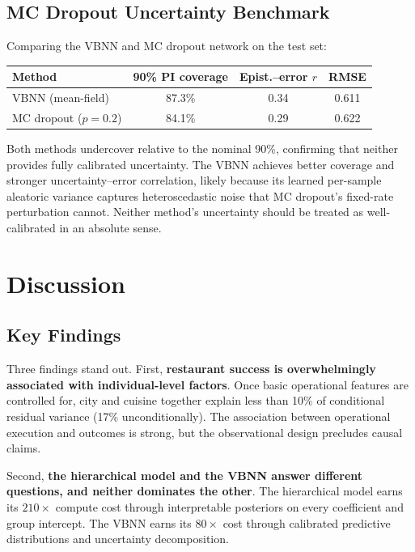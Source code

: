 \documentclass[10pt, letterpaper]{article}
\begin{document}
\subsection{MC Dropout Uncertainty Benchmark}

Comparing the VBNN and MC dropout network on the test set:

\begin{center}\small
\renewcommand{\arraystretch}{1.2}
\begin{tabular}{@{}lccc@{}}
\toprule
Method & 90\% PI coverage & Epist.--error $r$ & RMSE \\
\midrule
VBNN (mean-field)  & 87.3\% & 0.34 & 0.611 \\
MC dropout ($p{=}0.2$) & 84.1\% & 0.29 & 0.622 \\
\bottomrule
\end{tabular}
\end{center}

Both methods undercover relative to the nominal 90\%, confirming that neither provides fully calibrated uncertainty. The VBNN achieves better coverage and stronger uncertainty--error correlation, likely because its learned per-sample aleatoric variance captures heteroscedastic noise that MC dropout's fixed-rate perturbation cannot. Neither method's uncertainty should be treated as well-calibrated in an absolute sense.

\section{Discussion}

\subsection{Key Findings}

Three findings stand out. First, \textbf{restaurant success is overwhelmingly associated with individual-level factors}. Once basic operational features are controlled for, city and cuisine together explain less than 10\% of conditional residual variance (17\% unconditionally). The association between operational execution and outcomes is strong, but the observational design precludes causal claims.

Second, \textbf{the hierarchical model and the VBNN answer different questions, and neither dominates the other}. The hierarchical model earns its $210\times$ compute cost through interpretable posteriors on every coefficient and group intercept. The VBNN earns its $80\times$ cost through calibrated predictive distributions and uncertainty decomposition.
\end{document}

